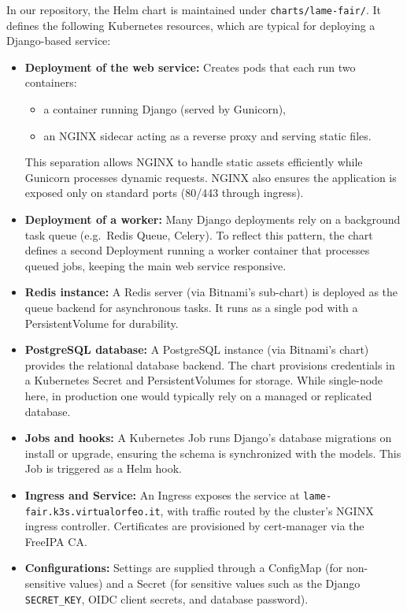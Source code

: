 \medskip

In our repository, the Helm chart is maintained under \texttt{charts/lame-fair/}. 
It defines the following Kubernetes resources, which are typical for deploying a 
Django-based service:  

\begin{itemize}
	\item \textbf{Deployment of the web service:}  
	Creates pods that each run two containers:  
	\begin{itemize}
		\item a container running Django (served by Gunicorn),  
		\item an NGINX sidecar acting as a reverse proxy and serving static files.  
	\end{itemize}  
	This separation allows NGINX to handle static assets efficiently while 
	Gunicorn processes dynamic requests. NGINX also ensures the application is 
	exposed only on standard ports (80/443 through ingress).  
	
	\item \textbf{Deployment of a worker:}  
	Many Django deployments rely on a background task queue (e.g.\ Redis Queue, 
	Celery). To reflect this pattern, the chart defines a second Deployment 
	running a worker container that processes queued jobs, keeping the main web 
	service responsive.  
	
	\item \textbf{Redis instance:}  
	A Redis server (via Bitnami’s sub-chart) is deployed as the queue backend for 
	asynchronous tasks. It runs as a single pod with a PersistentVolume for 
	durability.  
	
	\item \textbf{PostgreSQL database:}  
	A PostgreSQL instance (via Bitnami’s chart) provides the relational database 
	backend. The chart provisions credentials in a Kubernetes Secret and 
	PersistentVolumes for storage. While single-node here, in production one would 
	typically rely on a managed or replicated database.  
	
	\item \textbf{Jobs and hooks:}  
	A Kubernetes Job runs Django’s database migrations on install or upgrade, 
	ensuring the schema is synchronized with the models. This Job is triggered as 
	a Helm hook.  
	
	\item \textbf{Ingress and Service:}  
	An Ingress exposes the service at 
	\texttt{lame-fair.k3s.virtualorfeo.it}, with traffic routed by the cluster’s 
	NGINX ingress controller. Certificates are provisioned by cert-manager via the 
	FreeIPA CA.  
	
	\item \textbf{Configurations:}  
	Settings are supplied through a ConfigMap (for non-sensitive values) and a 
	Secret (for sensitive values such as the Django \texttt{SECRET\_KEY}, OIDC 
	client secrets, and database password).  
\end{itemize}

